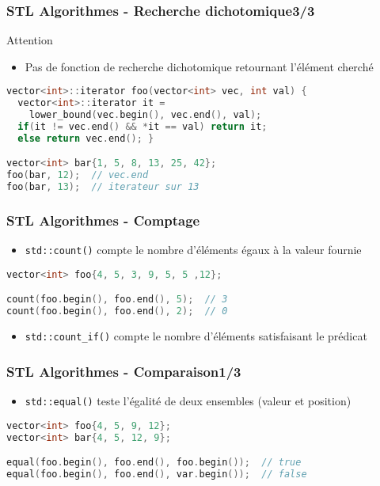\documentclass[C++.tex]{subfiles}
\begin{document}
\begin{frame}[fragile]
	\frametitle{STL Algorithmes - Recherche dichotomique\titlehfill{}3/3}
	\begin{alertblock}{Attention}
		\begin{itemize}
			\item Pas de fonction de recherche dichotomique retournant l'élément cherché
		\end{itemize}
	\end{alertblock}

	\begin{lstlisting}[language=C++]
vector<int>::iterator foo(vector<int> vec, int val) {
  vector<int>::iterator it = 
    lower_bound(vec.begin(), vec.end(), val);
  if(it != vec.end() && *it == val) return it;
  else return vec.end(); }

vector<int> bar{1, 5, 8, 13, 25, 42};
foo(bar, 12);  // vec.end
foo(bar, 13);  // iterateur sur 13
\end{lstlisting}
\end{frame}

\begin{frame}[fragile]
	\frametitle{STL Algorithmes - Comptage}
	\begin{itemize}
		\item \lstinline|std::count()| compte le nombre d'éléments égaux à la valeur fournie
	\end{itemize}

	\begin{lstlisting}[language=C++]
vector<int> foo{4, 5, 3, 9, 5, 5 ,12};

count(foo.begin(), foo.end(), 5);  // 3
count(foo.begin(), foo.end(), 2);  // 0\end{lstlisting}

	\begin{itemize}
		\item \lstinline|std::count_if()| compte le nombre d'éléments satisfaisant le prédicat
	\end{itemize}
\end{frame}

\begin{frame}[fragile]
	\frametitle{STL Algorithmes - Comparaison\titlehfill{}1/3}
	\begin{itemize}
		\item \lstinline|std::equal()| teste l'égalité de deux ensembles (valeur et position)
	\end{itemize}


	\begin{lstlisting}[language=C++]
vector<int> foo{4, 5, 9, 12};
vector<int> bar{4, 5, 12, 9};

equal(foo.begin(), foo.end(), foo.begin());  // true
equal(foo.begin(), foo.end(), var.begin());  // false\end{lstlisting}
\end{frame}
\end{document}
